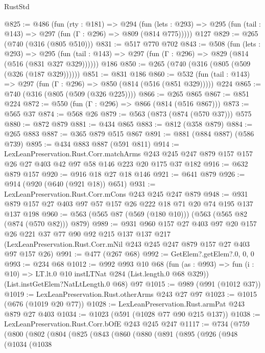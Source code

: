 \begin{lexlean}{RustStd}
\begin{coremodule}
{\begin{coremodule}
{{{{{{@825 := @486
    (fun (rty : @181) =>
    @294
      (fun (lets : @293) => @295 (fun (tail : @143) => @297 (fun (Γ : @296) => @809 (@814 @775)))))
    @127
@829 := @265 (@740 (@316 (@805 @510)))
@831 := @517 @770 @702
@843 := @508
    (fun (lets : @293) =>
    @295 (fun (tail : @143) => @297 (fun (Γ : @296) => @829 (@814 (@516 (@831 @327 @329))))))
    @186
@850 := @265 (@740 (@316 (@805 (@509 (@326 (@187 @329))))))
@851 := @831 @186
@860 := @532 (fun (tail : @143) => @297 (fun (Γ : @296) => @850 (@814 (@516 (@851 @329))))) @224
@865 := @740 (@316 (@805 (@509 (@326 @225))))
@866 := @265 @865
@867 := @851 @224
@872 := @550 (fun (Γ : @296) => @866 (@814 (@516 @867)))
@873 := @565 @37
@874 := @568 @26
@879 := @563 (@873 (@874 (@570 @37))) @575
@880 := @872 @879
@881 := @434 @865
@883 := @812 (@358 @879)
@884 := @265 @883
@887 := @365 @879 @515 @867
@891 := @881 (@884 @887) (@586 @739)
@895 := @434 @883 @887 (@591 @811)
@914 := LexLeanPreservation.Rust.Corr.matchArms
    @243
    @245
    @247
    @879
    @157
    @157
    @26
    @27
    @403
    @42
    @97
    @58
    @146
    @223
    @20
    @175
    @37
    @182
@916 := @632 @879 @157
@920 := @916 @18 @27 @18 @146
@921 := @641 @879
@926 := @914 (@920 (@640 (@921 @18)) @651)
@931 := LexLeanPreservation.Rust.Corr.mCons @243 @245 @247 @879
@948 := @931 @879 @157 @27 @403 @97 @57 @157 @26 @222 @18 @71 @20 @74 @195 @137 @137 @198
@960 := @563 (@565 @87 (@569 (@180 @10))) (@563 (@565 @82 (@874 (@570 @82))) @879)
@989 := @931
    @960
    @157
    @27
    @403
    @97
    @20
    @157
    @26
    @221
    @37
    @77
    @90
    @92
    @215
    @137
    @137
    @217
    (LexLeanPreservation.Rust.Corr.mNil @243 @245 @247 @879 @157 @27 @403 @97 @157 @26)
@991 := @477 (@267 @68)
@992 := GetElem?.getElem?.{0, 0, 0}
@993 := @234 @68
@1012 := @992
    @993
    @10
    @68
    (fun (as : @993) => fun (i : @10) => LT.lt.{0} @10 instLTNat @284 (List.length.{0} @68 @329))
    (List.instGetElem?NatLtLength.{0} @68)
    @97
@1015 := @989 (@991 (@1012 @37))
@1019 := LexLeanPreservation.Rust.otherArms @243 @27 @97
@1023 := @1015 (@676 (@1019 @20 @77))
@1028 := LexLeanPreservation.Rust.armPat @243 @879 @27 @403
@1034 := @1023 (@591 (@1028 @77 @90 @215 @137))
@1038 := LexLeanPreservation.Rust.Corr.bOfE @243 @245 @247
@1117 := @734
    (@759
      (@800
        (@802
          (@804
            (@825
              (@843
                (@860
                  (@880
                    (@891
                      (@895
                        (@926
                          (@948
                            (@1034
                              (@1038
}}}}}}
\end{coremodule}}
\end{coremodule}
\end{lexlean}
